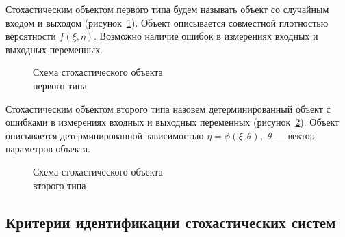 Стохастическим объектом первого типа будем называть объект со случайным входом и выходом
(рисунок~\ref{fig:type_first}).
Объект описывается совместной плотностью вероятности \( f(\xi, \eta) \).
Возможно наличие ошибок в измерениях входных и выходных переменных.

\begin{figure}[h!]
  \centering
  \caption{Схема стохастического объекта \\ первого типа}
  \label{fig:type_first}
\end{figure}

Стохастическим объектом второго типа назовем детерминированный объект с ошибками
в измерениях входных и выходных переменных (рисунок~\ref{fig:type_second}).
Объект описывается детерминированной зависимостью \( \eta = \phi(\xi, \theta), \)
\( \theta \) --- вектор параметров объекта.

\begin{figure}[h!]
  \centering
  \caption{Схема стохастического объекта \\ второго типа}
  \label{fig:type_second}
\end{figure}

\newpage
\subsection{Критерии идентификации стохастических систем}

